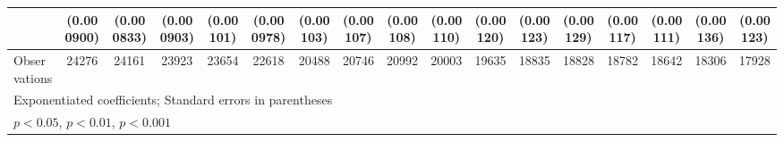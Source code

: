 {\begin{tabular}{l*{16}{c}}
                    &  (0.000900)         &  (0.000833)         &  (0.000903)         &   (0.00101)         &  (0.000978)         &   (0.00103)         &   (0.00107)         &   (0.00108)         &   (0.00110)         &   (0.00120)         &   (0.00123)         &   (0.00129)         &   (0.00117)         &   (0.00111)         &   (0.00136)         &   (0.00123)         \\
\hline
Observations        &       24276         &       24161         &       23923         &       23654         &       22618         &       20488         &       20746         &       20992         &       20003         &       19635         &       18835         &       18828         &       18782         &       18642         &       18306         &       17928         \\
\hline\hline
\multicolumn{17}{l}{\footnotesize Exponentiated coefficients; Standard errors in parentheses}\\
\multicolumn{17}{l}{\footnotesize \sym{*} \(p<0.05\), \sym{**} \(p<0.01\), \sym{***} \(p<0.001\)}\\
\end{tabular}
}
